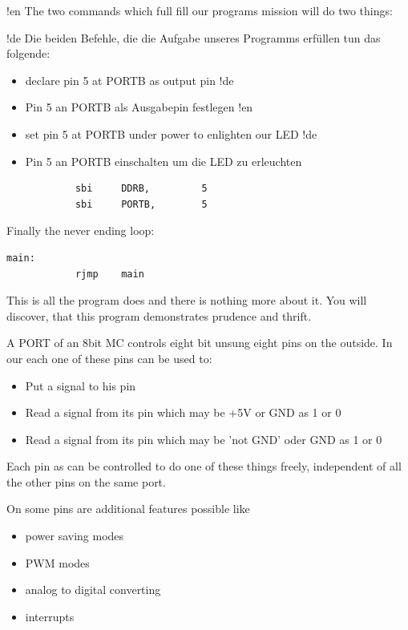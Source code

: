 !en The two commands which full fill our programs mission will do two things:

!de Die beiden Befehle, die die Aufgabe unseres Programms erfüllen tun das folgende:

\begin{itemize}
!en   \item  declare pin 5 at PORTB as output pin
!de   \item  Pin 5 an PORTB als Ausgabepin festlegen
!en   \item  set pin 5 at PORTB under power to enlighten our LED
!de   \item  Pin 5 an PORTB einschalten um die LED zu erleuchten
\end{itemize}

\begin{lstlisting}
            sbi     DDRB,         5
            sbi     PORTB,        5
\end{lstlisting}

Finally the never ending loop:

\begin{lstlisting}
main:
            rjmp    main
\end{lstlisting}

This is all the program does and there is nothing more about it. You will discover, that this program demonstrates prudence and thrift. 

A PORT of an 8bit MC controls eight bit unsung eight pins on the outside. In our \at each one of these pins can be used to:

\begin{itemize}
  \item Put a signal to his pin
  \item Read a signal from its pin which may be +5V or GND as 1 or 0
  \item Read a signal from its pin which may be 'not GND' oder GND as 1 or 0
\end{itemize}

Each pin as can be controlled to do one of these things freely, independent of all the other pins on the same port.

On some pins are additional features possible like

\begin{itemize}
  \item power saving modes
  \item PWM modes
  \item analog to digital converting
  \item interrupts
\end{itemize}

